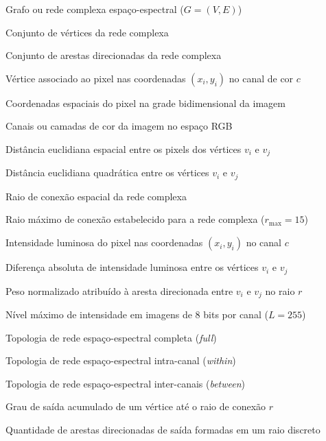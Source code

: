 \documentclass[
  12pt,		
  a4paper,	
  openright,  
  oneside,	
  chapter=TITLE,		
  section=TITLE,		
  english,	
  french,	    
  spanish,	
  brazil	    
]{abntex2}
\begin{document}
    \begin{simbolos}
        \item[$G$] Grafo ou rede complexa espaço-espectral ($G = (V, E)$)
        \item[$V$] Conjunto de vértices da rede complexa
        \item[$E$] Conjunto de arestas direcionadas da rede complexa
        \item[$v_i$] Vértice associado ao pixel nas coordenadas $(x_i, y_i)$ no canal de cor $c$
        \item[$(x_i, y_i)$] Coordenadas espaciais do pixel na grade bidimensional da imagem
        \item[$c, c_w$] Canais ou camadas de cor da imagem no espaço RGB
        \item[$\rho_{ij}$] Distância euclidiana espacial entre os pixels dos vértices $v_i$ e $v_j$
        \item[$\rho_{ij}^2$] Distância euclidiana quadrática entre os vértices $v_i$ e $v_j$
        \item[$r$] Raio de conexão espacial da rede complexa
        \item[$r_{\max}$] Raio máximo de conexão estabelecido para a rede complexa ($r_{\max} = 15$)
        \item[$I(x_i, y_i, c)$] Intensidade luminosa do pixel nas coordenadas $(x_i, y_i)$ no canal $c$
        \item[$w_{ij}$] Diferença absoluta de intensidade luminosa entre os vértices $v_i$ e $v_j$
        \item[$\omega_{ij}$] Peso normalizado atribuído à aresta direcionada entre $v_i$ e $v_j$ no raio $r$
        \item[$L$] Nível máximo de intensidade em imagens de 8 bits por canal ($L = 255$)
        \item[$\mathcal{N}$] Topologia de rede espaço-espectral completa (\textit{full})
        \item[$\mathcal{N}_w$] Topologia de rede espaço-espectral intra-canal (\textit{within})
        \item[$\mathcal{N}_b$] Topologia de rede espaço-espectral inter-canais (\textit{between})
        \item[$d_{\mathrm{out}}$] Grau de saída acumulado de um vértice até o raio de conexão $r$
        \item[$n_{\mathrm{out}}$] Quantidade de arestas direcionadas de saída formadas em um raio discreto

\end{simbolos}
\end{document}
